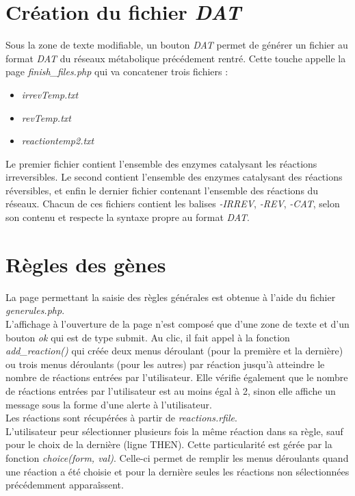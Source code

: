 \section{Création du fichier \emph{DAT}}
Sous la zone de texte modifiable, un bouton \emph{DAT} permet de générer un fichier au format \emph{DAT} du réseaux métabolique précédement rentré.
Cette touche appelle la page \emph{finish\_files.php} qui va concatener trois fichiers :
\begin{itemize}
\item \emph{irrevTemp.txt}
\item \emph{revTemp.txt}
\item \emph{reactiontemp2.txt}
\end{itemize}
Le premier fichier contient l'ensemble des enzymes catalysant les réactions irreversibles.
Le second contient l'ensemble des enzymes catalysant des réactions réversibles, et enfin le dernier fichier contenant l'ensemble des réactions du réseaux.
Chacun de ces fichiers contient les balises \emph{-IRREV}, \emph{-REV}, \emph{-CAT}, selon son contenu et respecte la syntaxe propre au format \emph{DAT}.



\section{Règles des gènes}
La page permettant la saisie des règles générales est obtenue à l'aide du fichier \emph{generules.php}.\\
L'affichage à l'ouverture de la page n'est composé que d'une zone de texte et d'un bouton \emph{ok} qui est de type submit. Au clic, il fait appel à la fonction \emph{add\_reaction()} qui créée deux menus déroulant (pour la première et la dernière) ou trois menus déroulants (pour les autres) par réaction jusqu'à atteindre le nombre de réactions entrées par l'utilisateur. Elle vérifie également que le nombre de réactions entrées par l'utilisateur est au moins égal à 2, sinon elle affiche un message sous la forme d'une alerte à l'utilisateur.\\
Les réactions sont récupérées à partir de \emph{reactions.rfile}.\\

L'utilisateur peur sélectionner plusieurs fois la m\^eme réaction dans sa règle, sauf pour le choix de la dernière (ligne THEN). Cette particularité est gérée par la fonction \emph{choice(form, val)}. Celle-ci permet de remplir les menus déroulants quand une réaction a été choisie et pour la dernière seules les réactions non sélectionnées précédemment appara\^issent.

